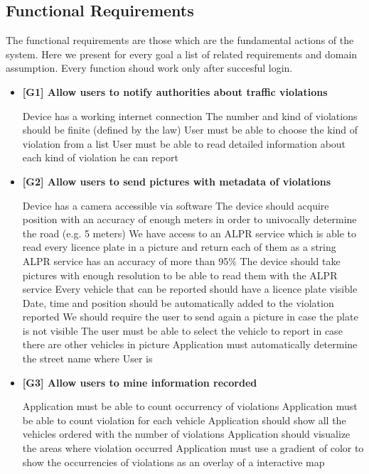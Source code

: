 \subsection{Functional  Requirements}
The functional requirements are those which are the fundamental actions of the system. Here we present for every goal a list  of related requirements and domain assumption.
Every function shoud work only after succesful login.

\begin{itemize}
\item \textbf{[G1] Allow users to notify authorities about traffic violations} %
\begin{itemize}
   Device has a working internet connection
   The number and kind of violations should be finite (defined by the law)
   User must be able to choose the kind of violation from a list
   User must be able to read detailed information about each kind of violation he can report
  \end{itemize}

\item \textbf{[G2] Allow users to send pictures with metadata of violations } %
\begin{itemize}
   Device has a camera accessible via software
   The device should acquire position with an accuracy of enough meters in order to univocally determine the road (e.g. 5 meters)
   We have access to an ALPR service which is able to read every licence plate in a picture and return each of them as a string
   ALPR service has an accuracy of more than 95\%
   The device should take pictures with enough resolution to be able to read them with the ALPR service
   Every vehicle that can be reported should have a licence plate visible
   Date, time and position should be automatically added to the violation reported
   We should require the user to send again a picture in case the plate is not visible
   The user must be able to select the vehicle to report in case there are other vehicles in picture
   Application must automatically determine the street name where User is
\end{itemize}

\item \textbf{[G3] Allow users to mine information recorded}  %
\begin{itemize}
   Application must be able to count occurrency of violations
   Application must be able to count violation for each vehicle
   Application should show all the vehicles ordered with the number of violations
   Application should visualize the areas where violation occurred
   Application must use a gradient of color to show the occurrencies of violations as an overlay of a interactive map
\end{itemize}


\end{itemize}
